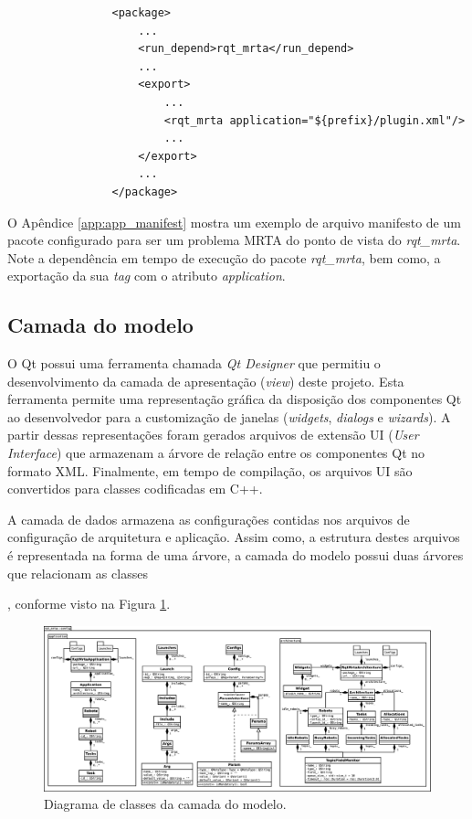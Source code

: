             \begin{lstlisting}
                <package>
                    ...
                    <run_depend>rqt_mrta</run_depend>
                    ...
                    <export>
                        ...
                        <rqt_mrta application="${prefix}/plugin.xml"/>
                        ...
                    </export>
                    ...
                </package>
            \end{lstlisting}
            
            O Apêndice \ref{app:app_manifest} mostra um exemplo de arquivo manifesto de um pacote configurado para ser um problema MRTA do ponto de vista do \textit{rqt\_mrta}. Note a dependência em tempo de execução do pacote \textit{rqt\_mrta}, bem como, a exportação da sua \textit{tag} com o atributo \textit{application}.
        
        \subsection{Camada do modelo}  \label{subset:rqt_mrta_model}
            
            
            O Qt \cite{ref:yafei2012qt} possui uma ferramenta chamada \textit{Qt Designer} que permitiu o desenvolvimento da camada de apresentação (\textit{view}) deste projeto. Esta ferramenta permite uma representação gráfica da disposição dos componentes Qt ao desenvolvedor para a customização de janelas (\textit{widgets}, \textit{dialogs} e \textit{wizards}). A partir dessas representações foram gerados arquivos de extensão UI (\textit{User Interface}) que armazenam a árvore de relação entre os componentes Qt no formato XML. Finalmente, em tempo de compilação, os arquivos UI são convertidos para classes codificadas em C++.
            
            A camada de dados armazena as configurações contidas nos arquivos de configuração de arquitetura e aplicação. Assim como, a estrutura destes arquivos é representada na forma de uma árvore, a camada do modelo possui duas árvores que relacionam as classes
            
            , conforme visto na Figura \ref{fig:rqt_mrta_model_uml}.
            
            \begin{figure}[p]
                \centering
                \includegraphics[width=.97\textheight,angle=90]{Figuras/3_desenvolvimento/rqt_mrta_model_uml.eps}
                \caption{Diagrama de classes da camada do modelo.} \label{fig:rqt_mrta_model_uml}
            \end{figure}
            
